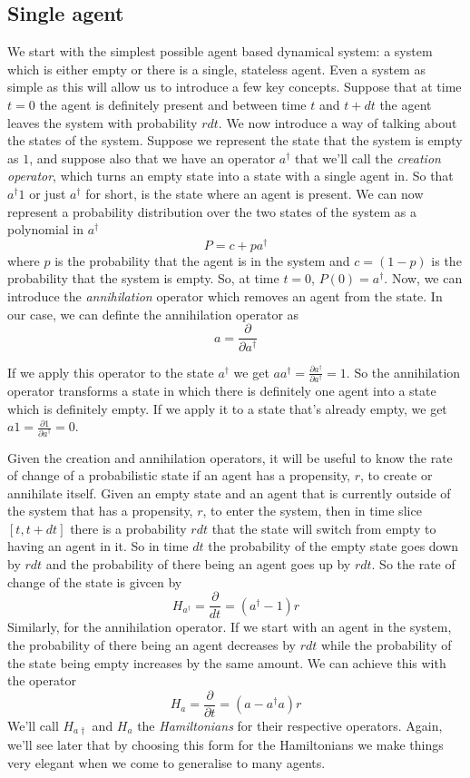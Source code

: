 \documentclass[letterpaper,twocolumn,10pt]{article}
\begin{document}
\subsection{Single agent}
We start with the simplest possible agent based dynamical system: a system which is either empty or there is a single, stateless agent. Even a system as simple as this will allow us to introduce a few key concepts. Suppose that at time $t=0$ the agent is definitely present and between time $t$ and $t+dt$ the agent leaves the system with probability $rdt$. We now introduce a way of talking about the states of the system. Suppose we represent the state that the system is empty as $1$, and suppose also that we have an operator $a^\dag$ that we'll call the \textit{creation operator}, which turns an empty state into a state with a single agent in. So that $a^\dag1$ or just $a^\dag$ for short, is the state where an agent is present. We can now represent a probability distribution over the two states of the system as a polynomial in $a^\dag$
\[
P = c + pa^\dag
\]
where $p$ is the probability that the agent is in the system and $c = (1-p)$ is the probability that the system is empty. So, at time $t=0$, $P(0) = a^\dag$. Now, we can introduce the \textit{annihilation} operator which removes an agent from the state. In our case, we can definte the annihilation operator as
\[
a = \frac{\partial}{\partial a^\dag}
\]

If we apply this operator to the state $a^\dag$ we get $aa^\dag = \frac{\partial a^\dag}{\partial a^\dag} = 1$. So the annihilation operator transforms a state in which there is definitely one agent into a state which is definitely empty. If we apply it to a state that's already empty, we get $a1 = \frac{\partial 1}{\partial a^\dag} = 0$.

Given the creation and annihilation operators, it will be useful to know the rate of change of a probabilistic state if an agent has a propensity, $r$, to create or annihilate itself. Given an empty state and an agent that is currently outside of the system that has a propensity, $r$, to enter the system, then in time slice $[t, t+dt]$ there is a probability $rdt$ that the state will switch from empty to having an agent in it. So in time $dt$ the probability of the empty state goes down by $rdt$ and the probability of there being an agent goes up by $rdt$. So the rate of change of the state is givcen by
\[
H_{a^\dag} = \frac{\partial}{dt} = (a^\dag - 1)r
\]
Similarly, for the annihilation operator. If we start with an agent in the system, the probability of there being an agent decreases by $rdt$ while the probability of the state being empty increases by the same amount. We can achieve this with the operator
\[
H_a = \frac{\partial}{\partial t} = (a - a^{\dag}a)r
\]
We'll call $H_{a\dag}$ and $H_a$ the \textit{Hamiltonians} for their respective operators. Again, we'll see later that by choosing this form for the Hamiltonians we make things very elegant when we come to generalise to many agents.
\end{document}
